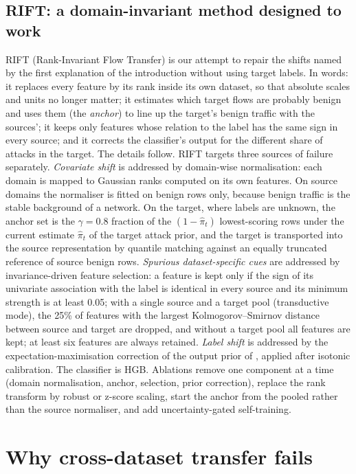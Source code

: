 \documentclass[11pt]{article}
\begin{document}
\subsection{RIFT: a domain-invariant method designed to work}\label{sec:rift}
RIFT (Rank-Invariant Flow Transfer) is our attempt to repair the shifts named by the first explanation of the introduction without using target labels.
In words: it replaces every feature by its rank inside its own dataset, so that absolute scales and units no longer matter; it estimates which target flows are probably benign and uses them (the \emph{anchor}) to line up the target's benign traffic with the sources'; it keeps only features whose relation to the label has the same sign in every source; and it corrects the classifier's output for the different share of attacks in the target.
The details follow.
RIFT targets three sources of failure separately.
\emph{Covariate shift} is addressed by domain-wise normalisation: each domain is mapped to Gaussian ranks computed on its own features.
On source domains the normaliser is fitted on benign rows only, because benign traffic is the stable background of a network.
On the target, where labels are unknown, the anchor set is the $\gamma=0.8$ fraction of the $(1-\hat\pi_t)$ lowest-scoring rows under the current estimate $\hat\pi_t$ of the target attack prior, and the target is transported into the source representation by quantile matching against an equally truncated reference of source benign rows.
\emph{Spurious dataset-specific cues} are addressed by invariance-driven feature selection: a feature is kept only if the sign of its univariate association with the label is identical in every source and its minimum strength is at least 0.05; with a single source and a target pool (transductive mode), the 25\% of features with the largest Kolmogorov--Smirnov distance between source and target are dropped, and without a target pool all features are kept; at least six features are always retained.
\emph{Label shift} is addressed by the expectation-maximisation correction of the output prior of \citet{saerens2002adjusting}, applied after isotonic calibration.
The classifier is HGB.
Ablations remove one component at a time (domain normalisation, anchor, selection, prior correction), replace the rank transform by robust or z-score scaling, start the anchor from the pooled rather than the source normaliser, and add uncertainty-gated self-training.

\section{Why cross-dataset transfer fails}\label{sec:results}
\end{document}

